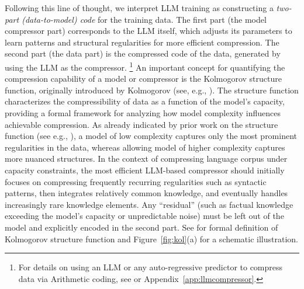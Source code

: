 \documentclass[11pt]{article}
\theoremstyle{plain}
\theoremstyle{definition}
\begin{document}
Following this line of thought, we interpret LLM training as constructing a {\em two-part (data-to-model) code} for the training data. The first part (the model compressor part) corresponds to the LLM itself, which adjusts its parameters to learn patterns and structural regularities for more efficient compression. The second part (the data part) is the compressed code of the data, generated by using the LLM as the compressor.
\footnote{For details on using an LLM or any auto-regressive predictor to compress data via Arithmetic coding, see \citep{rissanen1976generalized,cover2006elements,deletanglanguage}
or Appendix~\ref{app:llmcompressor}.
} 
An important concept for quantifying the compression capability of a model or compressor is the Kolmogorov structure function, originally introduced by Kolmogorov (see, e.g., \citep{li2008introduction,rissanen2005kolmogorov}). The structure function characterizes the compressibility of data as a function of the model’s capacity, providing a formal framework for analyzing how model complexity influences achievable compression.
As already indicated by prior work on the structure function (see e.g., \citep{vereshchagin2004kolmogorov,rissanen2005kolmogorov,lee2022relaxing}), a model of low complexity captures only the most prominent regularities in the data, whereas allowing model of higher complexity captures more nuanced structures. In the context of compressing language corpus under capacity constraints, the most efficient LLM-based compressor should initially focuses on compressing frequently recurring regularities such as syntactic patterns, then integrates relatively common knowledge, and eventually handles increasingly rare knowledge elements. Any “residual” (such as factual knowledge exceeding the model’s capacity or unpredictable noise) must be left out of the model and explicitly encoded in the second part. 
See  for formal definition
of Kolmogorov structure function
and Figure~\ref{fig:kol}(a) for a schematic illustration.
\end{document}
